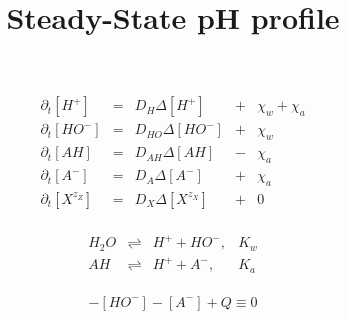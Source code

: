 \documentclass[aps,12pt]{revtex4}
\begin{document}
\title{Steady-State pH profile}
\maketitle


\begin{equation}
\begin{array}{rclcl}
	\partial_t [H^+]  & = & D_H \Delta [H^+]     &+&\chi_w+\chi_a\\
	\partial_t [HO^-] & = & D_{HO} \Delta [HO^-] &+&\chi_w\\
	\partial_t [AH]   & = & D_{AH} \Delta [AH]   &-&\chi_a\\
	\partial_t [A^-]  & = & D_{A} \Delta [A^-] &+& \chi_a\\
	\partial_t [X^{z_Z}] & = & D_X \Delta [X^{z_X}] &+& 0\\
\end{array}
\end{equation}

\begin{equation}
	\begin{array}{rcll}
	H_2O  & \rightleftharpoons & H^+ + HO^-, & K_w\\
	AH    & \rightleftharpoons & H^+ + A^-,  & K_a\\
	\end{array}
\end{equation}

\begin{equation}
	[H^+]-[HO^-]-[A^-]+Q\equiv0
\end{equation}
\end{document}
